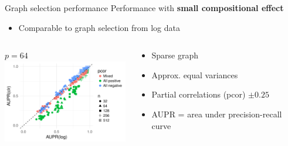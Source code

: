 \documentclass[professionalfonts]{beamer}
\begin{document}
\begin{frame}{Graph selection performance}
Performance with \textbf{small compositional effect}
\begin{itemize}
\item Comparable to graph selection from log data
\end{itemize}
\begin{columns}
\begin{column}{0.6\textwidth}
\begin{center}
$p = 64$ \\
\includegraphics[width=210px]{figs/scalefree-aupr-64.pdf}
\end{center}
\end{column}
\begin{column}{0.35\textwidth}
\begin{small}
\begin{itemize}
\item Sparse graph
\item Approx. equal variances
\item Partial correlations (pcor) $\pm 0.25$
\item AUPR = area under precision-recall curve
\end{itemize}
\end{small}
\end{column}
\end{columns}
\end{frame}
\end{document}
